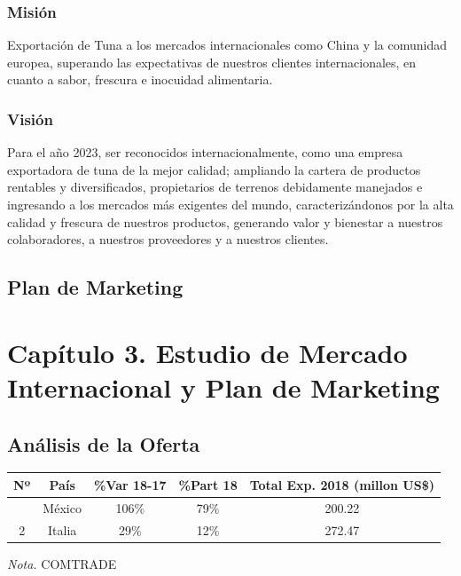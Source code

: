 \documentclass[
  stu,
  floatsintext,
  longtable,
  a4paper,
  nolmodern,
  notxfonts,
  notimes,
  12pt,
  colorlinks=true,linkcolor=blue,citecolor=blue,urlcolor=blue]{apa7}
\newcounter{none} %
\begin{document}
\subsubsection{Misión}\label{misiuxf3n}

Exportación de Tuna a los mercados internacionales como China y la
comunidad europea, superando las expectativas de nuestros clientes
internacionales, en cuanto a sabor, frescura e inocuidad alimentaria.

\subsubsection{Visión}\label{visiuxf3n}

Para el año 2023, ser reconocidos internacionalmente, como una empresa
exportadora de tuna de la mejor calidad; ampliando la cartera de
productos rentables y diversificados, propietarios de terrenos
debidamente manejados e ingresando a los mercados más exigentes del
mundo, caracterizándonos por la alta calidad y frescura de nuestros
productos, generando valor y bienestar a nuestros colaboradores, a
nuestros proveedores y a nuestros clientes.

\subsection{Plan de Marketing}\label{plan-de-marketing}

\section{Capítulo 3. Estudio de Mercado Internacional y Plan de
Marketing}\label{capuxedtulo-3.-estudio-de-mercado-internacional-y-plan-de-marketing}

\subsection{Análisis de la Oferta}\label{anuxe1lisis-de-la-oferta}

\begin{table}

{\caption{{Principales Países
Exportadores}{\label{tbl-paises-exportadores}}}}

{\def\LTcaptype{none} %
\begin{longtable}[]{@{}ccccc@{}}
\toprule\noalign{}
Nº & País & \%Var 18-17 & \%Part 18 & Total Exp. 2018 (millon US\$) \\
\midrule\noalign{}
\endhead
\bottomrule\noalign{}
\endlastfoot
1 & México & 106\% & 79\% & 200.22 \\
2 & Italia & 29\% & 12\% & 272.47 \\
\end{longtable}
}

\noindent \emph{Nota.} COMTRADE

\end{table}
\end{document}
